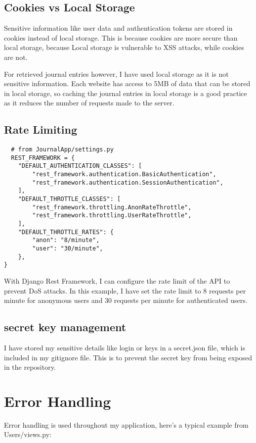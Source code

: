 \subsection{Cookies vs Local Storage}
Sensitive information like user data and authentication tokens are stored in cookies instead of local storage. This is because cookies are more secure than local storage, because Local storage is vulnerable to XSS attacks, while cookies are not. 

For retrieved journal entries however, I have used local storage as it is not sensitive information. Each website has access to 5MB of data that can be stored in local storage, so caching the journal entries in local storage is a good practice as it reduces the number of requests made to the server.

\subsection{Rate Limiting}
\begin{verbatim}
  # from JournalApp/settings.py
  REST_FRAMEWORK = {
    "DEFAULT_AUTHENTICATION_CLASSES": [
        "rest_framework.authentication.BasicAuthentication",
        "rest_framework.authentication.SessionAuthentication",
    ],
    "DEFAULT_THROTTLE_CLASSES": [
        "rest_framework.throttling.AnonRateThrottle",
        "rest_framework.throttling.UserRateThrottle",
    ],
    "DEFAULT_THROTTLE_RATES": {
        "anon": "8/minute",
        "user": "30/minute",
    },
}
\end{verbatim}
With Django Rest Framework, I can configure the rate limit of the API to prevent DoS attacks. In this example, I have set the rate limit to 8 requests per minute for anonymous users and 30 requests per minute for authenticated users. 

\subsection{secret key management}
I have stored my sensitive details like login or keys in a secret.json file, which is included in my gitignore file. This is to prevent the secret key from being exposed in the repository. 

\section{Error Handling}
Error handling is used throughout my application, here's a typical example from Users/views.py:


